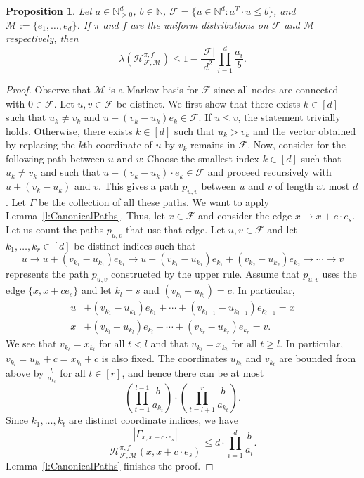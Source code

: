 \documentclass[11pt]{amsart}
\newtheorem{prop}[thm]{Proposition}
\theoremstyle{definition}
\numberwithin{equation}{section}
\newcommand{\ring}[1]{\ensuremath{\mathbb{#1}}}
\renewcommand{\>}{\rangle}
\newcommand{\<}{\langle}
\newcommand{\0}{\mathbf{0}}
\newcommand{\1}{\mathbf{1}}
\newcommand{\2}{\mathbf{2}}
\newcommand\NN{\ring{N}}
\newcommand\cF{{\mathcal F}}
\newcommand\cM{{\mathcal M}}
\newcommand{\heatbath}[4]{\mathcal{H}^{#1,#2}_{#3,#4}}
\begin{document}
\begin{prop}\label{p:Hyperrectangles}
Let $a\in\NN^d_{>0}$, $b\in\NN$,
$\cF=\{u\in\NN^d: a^T\cdot u\le b\}$, and
$\cM:=\{e_1,\dots,e_d\}$. If $\pi$ and $f$ are the uniform
distributions on $\cF$ and $\cM$ respectively, then
\begin{equation*}
\lambda(\heatbath{\pi}{f}{\cF}{\cM})\le
1-\frac{|\cF|}{d^2}\prod_{i=1}^d\frac{a_i}{b}.
\end{equation*}
\end{prop}
\begin{proof}
Observe that $\cM$ is a Markov basis for $\cF$ since all nodes are connected
with $0\in\cF$. Let $u,v\in\cF$ be distinct. We first show
that there exists $k\in[d]$ such that $u_k\neq v_k$ and
$u+(v_k-u_k)e_k\in\cF$. If $u\le v$, the statement trivially holds.
Otherwise, there exists $k\in [d]$ such that $u_k>v_k$ and the vector
obtained by replacing the $k$th coordinate of $u$ by $v_k$ remains in $\cF$.
Now, consider for the following path between $u$ and $v$: Choose the smallest index
$k\in[d]$ such that $u_k\neq v_k$ and such that $u+(v_k-u_k)\cdot
e_k\in\cF$ and proceed recursively with $u+(v_k-u_k)$ and $v$. This
gives a path $p_{u,v}$ between $u$ and $v$ of length at most $d$. Let
$\Gamma$ be the collection of all these paths.
We want to apply Lemma~\ref{l:CanonicalPaths}. Thus, let $x\in\cF$ and
consider the edge $x\rightarrow x+c\cdot e_s$. Let us count the paths
$p_{u,v}$ that use that edge. Let $u,v\in\cF$ and let $k_1,\dots,k_r\in
[d]$ be distinct indices such that
\begin{equation*}
u\rightarrow u+(v_{k_1}-u_{k_1})e_{k_1}\rightarrow
u+(v_{k_1}-u_{k_1})e_{k_1}+(v_{k_2}-u_{k_2})e_{k_2}\rightarrow\cdots\rightarrow
v
\end{equation*}
represents the path $p_{u,v}$ constructed by the upper rule. Assume
that $p_{u,v}$ uses the edge $\{x,x+ce_s\}$ and let $k_l=s$ and
$(v_{k_l}-u_{k_l})=c$. In particular,
\begin{equation*}
\begin{split}
u&+(v_{k_1}-u_{k_1})e_{k_1}+\cdots +(v_{k_{l-1}}-u_{k_{l-1}})e_{k_{l-1}}=x\\
x&+(v_{k_l}-u_{k_l})e_{k_l}+\cdots +(v_{k_r}-u_{k_r})e_{k_r}=v.
\end{split}
\end{equation*}
We see that $v_{k_t}=x_{k_t}$ for all $t< l$ and that
$u_{k_t}=x_{k_t}$ 
for all $t\ge l$. In particular, $v_{k_l}=u_{k_l}+c=x_{k_l}+c$ is also
fixed. The coordinates $u_{k_t}$ and $v_{k_t}$ are bounded
from above by $\frac{b}{a_{k_t}}$ for
all $t\in[r]$, and hence there can be at most 
\begin{equation*}
\left(\prod_{t=1}^{l-1}\frac{b}{a_{k_t}}\right)\cdot
\left(\prod_{t=l+1}^{r}\frac{b}{a_{k_t}}\right).
\end{equation*}
Since $k_1,\dots,k_t$ are distinct coordinate indices, we have
\begin{equation*}
\frac{|\Gamma_{x,x+c\cdot e_s}|}{\heatbath{\pi}{f}{\cF}{\cM}(x,x+c\cdot
e_s)}\le d\cdot\prod_{i=1}^d\frac{b}{a_i}.
\end{equation*}
Lemma~\ref{l:CanonicalPaths} finishes the proof.
\end{proof}
\end{document}
